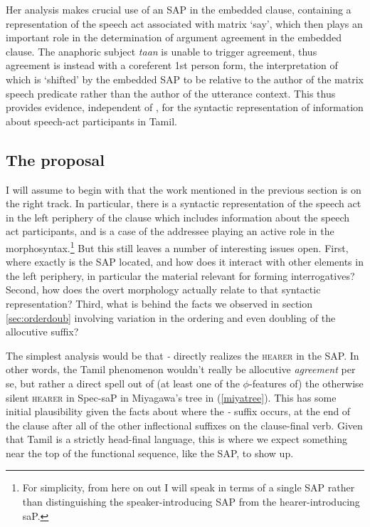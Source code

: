 \documentclass[output=paper, modfonts, nonflat]{langsci/langscibook}
\begin{document}
Her analysis makes crucial use of an SAP in the embedded clause,
containing a representation of the speech act associated with matrix
`say', which then plays an important role in the determination of
argument agreement in the embedded clause. The anaphoric subject
\textit{taan} is unable to trigger agreement, thus agreement is
instead with a coreferent 1st person form, the interpretation of which
is `shifted' by the embedded SAP to be relative to the author of the
matrix speech predicate rather than the author of the utterance
context. This thus provides evidence, independent of \allagr, for the
syntactic representation of information about speech-act participants
in Tamil.

\subsection{The proposal}
\label{sec:account}

I will assume to begin with that the work mentioned in the previous
section is on the right track. In particular, there is a syntactic
representation of the speech act in the left periphery of the clause
which includes information about the speech act participants, and
\allagr{} is a case of the addressee playing an active role in the
morphosyntax.\footnote{For simplicity, from here on out I will speak
  in terms of a single SAP rather than distinguishing the
  speaker-introducing SAP from the hearer-introducing saP.} But this
still leaves a number of interesting issues open. First, where exactly
is the SAP located, and how does it interact with other elements in
the left periphery, in particular the material relevant for forming
interrogatives? Second, how does the overt \allagr{} morphology
actually relate to that syntactic representation?  Third, what is
behind the facts we observed in section \ref{sec:orderdoub} involving
variation in the ordering and even doubling of the allocutive suffix?

The simplest analysis would be that \textit{-\nga} directly realizes
the \textsc{hearer} in the SAP.  In other words, the Tamil phenomenon
wouldn't really be allocutive \textit{agreement} per se, but rather a
direct spell out of (at least one of the $\phi$-features of) the
otherwise silent \textsc{hearer} in Spec-saP in Miyagawa's tree in
(\ref{miyatree}). This has some initial plausibility given the facts
about where the \textit{-\nga} suffix occurs, at the end of the clause
after all of the other inflectional suffixes on the clause-final verb.
Given that Tamil is a strictly head-final language, this is where we
expect something near the top of the functional sequence, like the
SAP, to show up.
\end{document}
